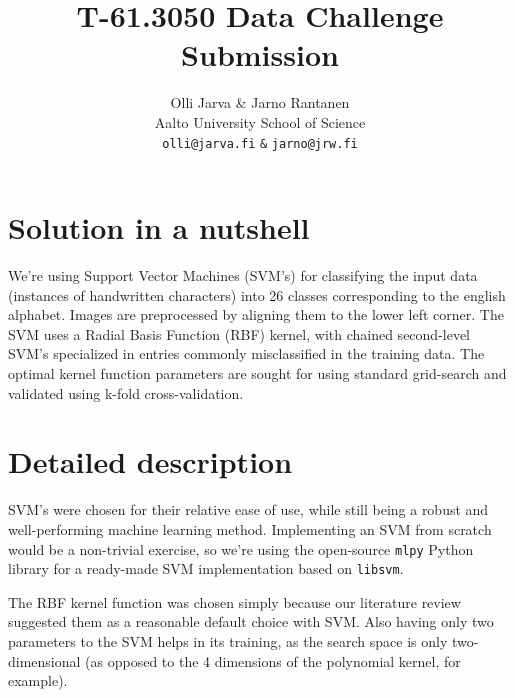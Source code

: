 \documentclass{netsec2012}
\begin{document}

\title{T-61.3050 Data Challenge Submission}

\author{Olli Jarva \& Jarno Rantanen \\
        Aalto University School of Science \\
	\texttt{olli@jarva.fi} \texttt{\&} \texttt{jarno@jrw.fi}}
\maketitle


\section{Solution in a nutshell}

We're using Support Vector Machines (SVM's) for classifying the input data (instances of
handwritten characters) into 26 classes corresponding to the english alphabet.
Images are preprocessed by aligning them to the lower left corner.
The SVM uses a Radial Basis Function (RBF) kernel, with chained second-level SVM's specialized
in entries commonly misclassified in the training data.
The optimal kernel function parameters are sought for using standard grid-search and
validated using k-fold cross-validation.

\section{Detailed description}

SVM's were chosen for their relative ease of use, while still being a robust and well-performing
machine learning method.  Implementing an SVM from scratch would be a non-trivial exercise, so
we're using the open-source \texttt{mlpy} Python library for a ready-made SVM implementation
based on \texttt{libsvm}.


The RBF kernel function was chosen simply because our literature review suggested them as a reasonable
default choice with SVM.  Also having only two parameters to the SVM helps in its training,
as the search space is only two-dimensional (as opposed to the 4 dimensions of the polynomial kernel,
for example).
\end{document}
